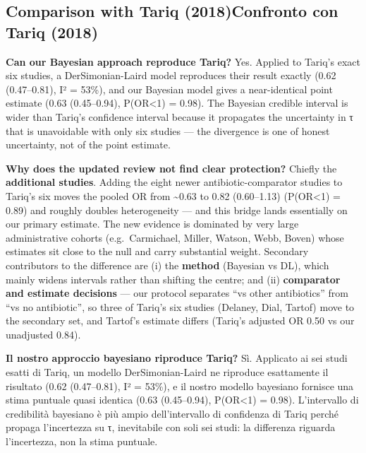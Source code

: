 \documentclass[
  letterpaper,
  DIV=11,
  numbers=noendperiod]{scrartcl}
\begin{document}
\subsection{\texorpdfstring{{Comparison with Tariq (2018)}{Confronto con
Tariq
(2018)}}{Comparison with Tariq (2018)Confronto con Tariq (2018)}}\label{comparison-with-tariq-2018confronto-con-tariq-2018}

\textbf{Can our Bayesian approach reproduce Tariq?} Yes. Applied to
Tariq's exact six studies, a DerSimonian-Laird model reproduces their
result exactly (0.62 (0.47--0.81), I² = 53\%), and our Bayesian model
gives a near-identical point estimate (0.63 (0.45--0.94),
P(OR\textless1) = 0.98). The Bayesian credible interval is wider than
Tariq's confidence interval because it propagates the uncertainty in τ
that is unavoidable with only six studies --- the divergence is one of
honest uncertainty, not of the point estimate.

\textbf{Why does the updated review not find clear protection?} Chiefly
the \textbf{additional studies}. Adding the eight newer
antibiotic-comparator studies to Tariq's six moves the pooled OR from
\textasciitilde0.63 to 0.82 (0.60--1.13) (P(OR\textless1) = 0.89) and
roughly doubles heterogeneity --- and this bridge lands essentially on
our primary estimate. The new evidence is dominated by very large
administrative cohorts (e.g.~Carmichael, Miller, Watson, Webb, Boven)
whose estimates sit close to the null and carry substantial weight.
Secondary contributors to the difference are (i) the \textbf{method}
(Bayesian vs DL), which mainly widens intervals rather than shifting the
centre; and (ii) \textbf{comparator and estimate decisions} --- our
protocol separates ``vs other antibiotics'' from ``vs no antibiotic'',
so three of Tariq's six studies (Delaney, Dial, Tartof) move to the
secondary set, and Tartof's estimate differs (Tariq's adjusted OR 0.50
vs our unadjusted 0.84).

\textbf{Il nostro approccio bayesiano riproduce Tariq?} Sì. Applicato ai
sei studi esatti di Tariq, un modello DerSimonian-Laird ne riproduce
esattamente il risultato (0.62 (0.47--0.81), I² = 53\%), e il nostro
modello bayesiano fornisce una stima puntuale quasi identica (0.63
(0.45--0.94), P(OR\textless1) = 0.98). L'intervallo di credibilità
bayesiano è più ampio dell'intervallo di confidenza di Tariq perché
propaga l'incertezza su τ, inevitabile con soli sei studi: la differenza
riguarda l'incertezza, non la stima puntuale.
\end{document}
